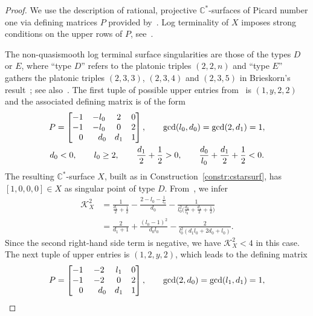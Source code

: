 \documentclass[pdftex]{sigma}
\theoremstyle{definition}
\def\CC{{\mathbb C}}
\begin{document}
\begin{proof}
We use the description of rational, projective
$\CC^*$-surfaces of Picard number one via
defining matrices $P$ provided
by~\cite[Construction~4.2, Proposition~4.5]{HaHaHaSp}.
Log terminality of $X$ imposes strong
conditions on the upper rows of $P$,
see~\cite[Proposition~5.9]{HaHaHaSp}.

The non-quasismooth log terminal surface singularities
are those of the types $D$ or $E$, where ``type $D$''
refers to the platonic triples $(2,2,n)$ and ``type $E$''
gathers the platonic triples $(2,3,3)$, $(2,3,4)$
and $(2,3,5)$ in Brieskorn's result~\cite[Satz~2.10]{Br};
see also~\cite[Proposition~8.14]{HaHaSp}.
The first tuple of possible upper entries
from~\cite[Proposition~5.9]{HaHaHaSp} is
$(1,y,2,2)$ and the associated defining
matrix is of the form
\begin{gather*}
P
 =
\begin{bmatrix}
-1 & -l_0 & 2 & 0
\\
-1 & -l_0 & 0 & 2
\\
\hphantom{-} 0 & \hphantom{-}d_0 & d_1 & 1
\end{bmatrix},
\qquad
\gcd(l_0,d_0) = \gcd(2,d_1) = 1,
\\
d_0 < 0, \qquad
l_0 \ge 2, \qquad
\frac{d_1}{2}+\frac{1}{2} > 0, \qquad
\frac{d_0}{l_0}+\frac{d_1}{2}+\frac{1}{2} < 0.
\end{gather*}
The resulting $\CC^*$-surface $X$, built as in
Construction~\ref{constr:cstarsurf}, has
$[1,0,0,0] \in X$ as singular point
of type $D$.
From~\cite[Proposition~7.9]{HaHaSp}, we infer
\begin{align*}
\mathcal{K}_X^2
&{}=
\frac{1}{\frac{d_1}{2}+\frac{1}{2}}
 -
\frac{2-l_0-\frac{1}{l_0}}{d_0}
 -
\frac{1}{l_0^2\bigl(\frac{d_0}{l_0}+\frac{d_1}{2}+\frac{1}{2}\bigr)}
\\[10pt]
&{}=
\frac{2}{d_1+1}
 +
\frac{(l_0-1)^2}{d_0l_0}
 -
\frac{2}{l_0^2(d_1l_0 + 2d_0 + l_0)}.
\end{align*}
Since the second right-hand side term is negative,
we have $\mathcal{K}_X^2 < 4$ in this case.
The next tuple of upper entries is $(1,2,y,2)$,
which leads to the defining matrix
\begin{gather*}
P
 =
\begin{bmatrix}
-1 & -2 & l_1 & 0
\\
-1 & -2 & 0 & 2
\\
\hphantom{-} 0 & \hphantom{-}d_0 & d_1 & 1
\end{bmatrix},
\qquad
\gcd(2,d_0) = \gcd(l_1,d_1) = 1,
\\

\end{gather*}
\end{proof}
\end{document}
